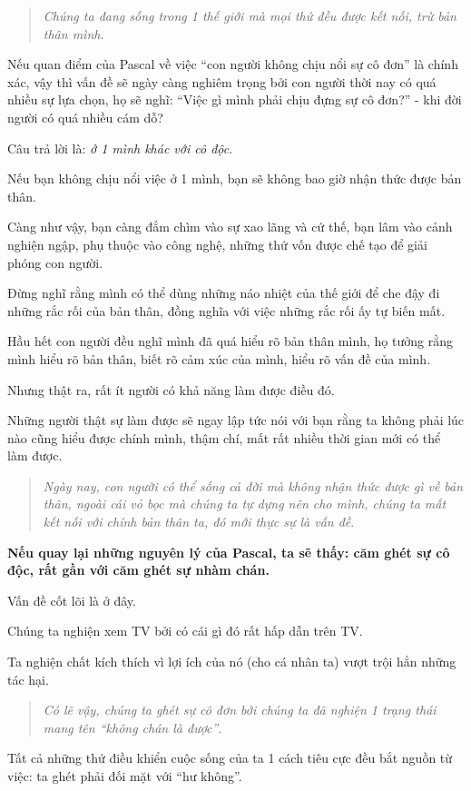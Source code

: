 \documentclass{article}
\begin{document}
\begin{quotation}
	\textit{Chúng ta đang sống trong 1 thế giới mà mọi thứ đều được kết nối, trừ bản thân mình}.
\end{quotation}
Nếu quan điểm của Pascal về việc ``con người không chịu nổi sự cô đơn'' là chính xác, vậy thì vấn đề sẽ ngày càng nghiêm trọng bởi con người thời nay có quá nhiều sự lựa chọn, họ sẽ nghĩ: ``Việc gì mình phải chịu đựng sự cô đơn?'' - khi đời người có quá nhiều cám dỗ?

%
Câu trả lời là: \textit{ở 1 mình khác với cô độc}.

Nếu bạn không chịu nổi việc ở 1 mình, bạn sẽ không bao giờ nhận thức được bản thân.

Càng như vậy, bạn càng đắm chìm vào sự xao lãng và cứ thế, bạn lâm vào cảnh nghiện ngập, phụ thuộc vào công nghệ, những thứ vốn được chế tạo để giải phóng con người.

%
Đừng nghĩ rằng mình có thể dùng những náo nhiệt của thế giới để che đậy đi những rắc rối của bản thân, đồng nghĩa với việc những rắc rối ấy tự biến mất.

%
Hầu hết con người đều nghĩ mình đã quá hiểu rõ bản thân mình, họ tưởng rằng mình hiểu rõ bản thân, biết rõ cảm xúc của mình, hiểu rõ vấn đề của mình.

Nhưng thật ra, rất ít người có khả năng làm được điều đó.

Những người thật sự làm được sẽ ngay lập tức nói với bạn rằng ta không phải lúc nào cũng hiểu được chính mình, thậm chí, mất rất nhiều thời gian mới có thể làm được.

\begin{quotation}
	\textit{Ngày nay, con người có thể sống cả đời mà không nhận thức được gì về bản thân, ngoài cái vỏ bọc mà chúng ta tự dựng nên cho mình, chúng ta mất kết nối với chính bản thân ta, đó mới thực sự là vấn đề}.
\end{quotation}
\textbf{Nếu quay lại những nguyên lý của Pascal, ta sẽ thấy: căm ghét sự cô độc, rất gần với căm ghét sự nhàm chán.}

%
Vấn đề cốt lõi là ở đây.

Chúng ta nghiện xem TV bởi có cái gì đó rất hấp dẫn trên TV.

Ta nghiện chất kích thích vì lợi ích của nó (cho cá nhân ta) vượt trội hẳn những tác hại.

\begin{quotation}
	\textit{Có lẽ vậy, chúng ta ghét sự cô đơn bởi chúng ta đã nghiện 1 trạng thái mang tên ``không chán là được''}.
\end{quotation}
Tất cả những thứ điều khiển cuộc sống của ta 1 cách tiêu cực đều bắt nguồn từ việc: ta ghét phải đối mặt với ``hư không''.
\end{document}
